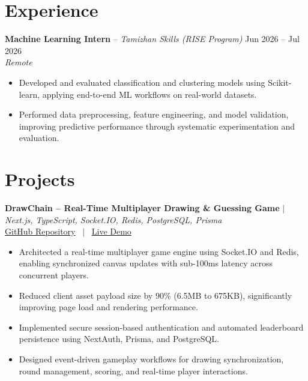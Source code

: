 \documentclass[10pt, a4paper]{article}
\begin{document}

\section{Experience}

\textbf{Machine Learning Intern} -- \textit{Tamizhan Skills (RISE Program)} \hfill Jun 2026 -- Jul 2026 \\
\textit{\small{Remote}} \\
\begin{itemize}

    \item Developed and evaluated classification and clustering models using Scikit-learn, applying end-to-end ML workflows on real-world datasets.

    \item Performed data preprocessing, feature engineering, and model validation, improving predictive performance through systematic experimentation and evaluation.

\end{itemize}
\vspace{2pt}



\section{Projects}

\textbf{DrawChain -- Real-Time Multiplayer Drawing \& Guessing Game} $|$ \textit{Next.js, TypeScript, Socket.IO, Redis, PostgreSQL, Prisma} \\

\small{
\href{https://github.com/PankajKumar-11/DrawChain}{GitHub Repository}
 \ $|$ \ \href{https://demo.example.com}{Live Demo}
} \\

\begin{itemize}

    \item Architected a real-time multiplayer game engine using Socket.IO and Redis, enabling synchronized canvas updates with sub-100ms latency across concurrent players.

    \item Reduced client asset payload size by 90\% (6.5MB to 675KB), significantly improving page load and rendering performance.

    \item Implemented secure session-based authentication and automated leaderboard persistence using NextAuth, Prisma, and PostgreSQL.

    \item Designed event-driven gameplay workflows for drawing synchronization, round management, scoring, and real-time player interactions.

\end{itemize}
\vspace{2pt}
\end{document}
